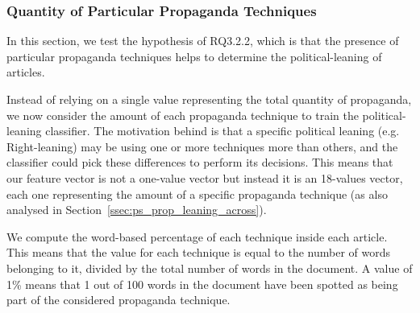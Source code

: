



\subsubsection{Quantity of Particular Propaganda Techniques}

In this section, we test the hypothesis of RQ3.2.2, which is that the presence of particular propaganda techniques helps to determine the political-leaning of articles. 

Instead of relying on a single value representing the total quantity of propaganda, we now consider the amount of each propaganda technique to train the political-leaning classifier.
The motivation behind is that a specific political leaning (e.g. Right-leaning) may be using one or more techniques more than others, and the classifier could pick these differences to perform its decisions.
This means that our feature vector is not a one-value vector but instead it is an 18-values vector, each one representing the amount of a specific propaganda technique (as also analysed in Section~\ref{ssec:ps_prop_leaning_across}).


We compute the word-based percentage of each technique inside each article. This means that the value for each technique is equal to the number of words belonging to it, divided by the total number of words in the document. A value of 1\% means that 1 out of 100 words in the document have been spotted as being part of the considered propaganda technique.


